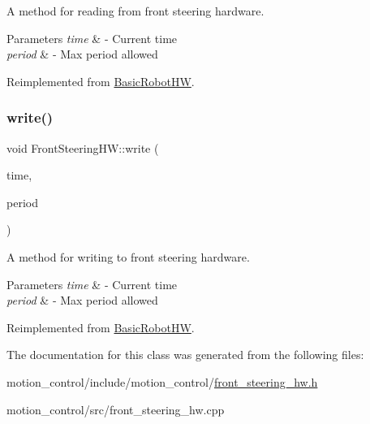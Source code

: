 A method for reading from front steering hardware. 


\begin{DoxyParams}{Parameters}
{\em time} & -\/ Current time \\
\hline
{\em period} & -\/ Max period allowed \\
\hline
\end{DoxyParams}


Reimplemented from \hyperlink{classBasicRobotHW_a4246adb060fa49a3eb9d5d26845b6425}{Basic\+Robot\+HW}.

\mbox{\label{classFrontSteeringHW_aa0e57cc4919044aecb7d1c76c8d4ac21}} 
\subsubsection{\texorpdfstring{write()}{write()}}
{\footnotesize\ttfamily void Front\+Steering\+H\+W\+::write (\begin{DoxyParamCaption}\item[{const ros\+::\+Time \&}]{time,  }\item[{const ros\+::\+Duration \&}]{period }\end{DoxyParamCaption})\hspace{0.3cm}{\ttfamily [virtual]}}



A method for writing to front steering hardware. 


\begin{DoxyParams}{Parameters}
{\em time} & -\/ Current time \\
\hline
{\em period} & -\/ Max period allowed \\
\hline
\end{DoxyParams}


Reimplemented from \hyperlink{classBasicRobotHW_a62add5eabfca2f88a5035db8b8240bb3}{Basic\+Robot\+HW}.



The documentation for this class was generated from the following files\+:\begin{DoxyCompactItemize}
\item 
motion\+\_\+control/include/motion\+\_\+control/\hyperlink{front__steering__hw_8h}{front\+\_\+steering\+\_\+hw.\+h}\item 
motion\+\_\+control/src/front\+\_\+steering\+\_\+hw.\+cpp\end{DoxyCompactItemize}

